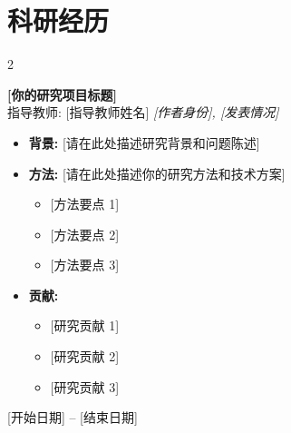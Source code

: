 \documentclass[10pt, letterpaper]{article}
\newenvironment{highlights}{
    \begin{itemize}[
        topsep=0.10 cm,
        parsep=0.10 cm,
        partopsep=0pt,
        itemsep=0pt,
        leftmargin=0.4 cm + 10pt
    ]
}{\end{itemize}} %
\newenvironment{twocolentry}[2][]{\onecolentry
    \def\secondColumn{#2}
    \setcolumnwidth{\fill, 4.5 cm}
    \begin{paracol}{2}
}{\switchcolumn \raggedleft \secondColumn
    \end{paracol}
    \endonecolentry} %
\begin{document}
    \section{科研经历}

        \begin{twocolentry}{
            [你的研究地点]

        [开始日期] -- [结束日期]
        }
            \textbf{[你的研究项目标题]} \\
            {\small\textcolor{softGray}{指导教师: [指导教师姓名]}} \hfill \textit{[作者身份], [发表情况]}
            \begin{highlights}
                \item \textbf{背景:} [请在此处描述研究背景和问题陈述]
                \item \textbf{方法:} [请在此处描述你的研究方法和技术方案]
                \begin{itemize}[topsep=0.05cm, parsep=0pt, itemsep=0pt, leftmargin=*]
                    \item {[方法要点 1]}
                    \item {[方法要点 2]}
                    \item {[方法要点 3]}
                \end{itemize}
                \item \textbf{贡献:}
                \begin{itemize}[topsep=0.05cm, parsep=0pt, itemsep=0pt, leftmargin=*]
                    \item {[研究贡献 1]}
                    \item {[研究贡献 2]}
                    \item {[研究贡献 3]}
                \end{itemize}
            \end{highlights}
        \end{twocolentry}

        \vspace{0.2 cm}
\end{document}
